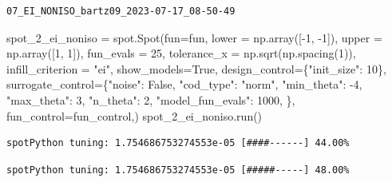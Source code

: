 \documentclass[
  letterpaper,
  DIV=11,
  numbers=noendperiod]{scrreprt}
\newenvironment{Shaded}{\begin{snugshade}}{\end{snugshade}}
\newcommand{\DecValTok}[1]{\textcolor[rgb]{0.68,0.00,0.00}{#1}}
\newcommand{\NormalTok}[1]{\textcolor[rgb]{0.00,0.23,0.31}{#1}}
\newcommand{\OperatorTok}[1]{\textcolor[rgb]{0.37,0.37,0.37}{#1}}
\newcommand{\StringTok}[1]{\textcolor[rgb]{0.13,0.47,0.30}{#1}}
\newcommand{\VariableTok}[1]{\textcolor[rgb]{0.07,0.07,0.07}{#1}}
\begin{document}
\begin{verbatim}
07_EI_NONISO_bartz09_2023-07-17_08-50-49
\end{verbatim}

\begin{Shaded}
\begin{Highlighting}[]
\NormalTok{spot\_2\_ei\_noniso }\OperatorTok{=}\NormalTok{ spot.Spot(fun}\OperatorTok{=}\NormalTok{fun,}
\NormalTok{                   lower }\OperatorTok{=}\NormalTok{ np.array([}\OperatorTok{{-}}\DecValTok{1}\NormalTok{, }\OperatorTok{{-}}\DecValTok{1}\NormalTok{]),}
\NormalTok{                   upper }\OperatorTok{=}\NormalTok{ np.array([}\DecValTok{1}\NormalTok{, }\DecValTok{1}\NormalTok{]),}
\NormalTok{                   fun\_evals }\OperatorTok{=} \DecValTok{25}\NormalTok{,}
\NormalTok{                   tolerance\_x }\OperatorTok{=}\NormalTok{ np.sqrt(np.spacing(}\DecValTok{1}\NormalTok{)),}
\NormalTok{                   infill\_criterion }\OperatorTok{=} \StringTok{"ei"}\NormalTok{,}
\NormalTok{                   show\_models}\OperatorTok{=}\VariableTok{True}\NormalTok{,}
\NormalTok{                   design\_control}\OperatorTok{=}\NormalTok{\{}\StringTok{"init\_size"}\NormalTok{: }\DecValTok{10}\NormalTok{\},}
\NormalTok{                   surrogate\_control}\OperatorTok{=}\NormalTok{\{}\StringTok{"noise"}\NormalTok{: }\VariableTok{False}\NormalTok{,}
                                      \StringTok{"cod\_type"}\NormalTok{: }\StringTok{"norm"}\NormalTok{,}
                                      \StringTok{"min\_theta"}\NormalTok{: }\OperatorTok{{-}}\DecValTok{4}\NormalTok{,}
                                      \StringTok{"max\_theta"}\NormalTok{: }\DecValTok{3}\NormalTok{,}
                                      \StringTok{"n\_theta"}\NormalTok{: }\DecValTok{2}\NormalTok{,}
                                      \StringTok{"model\_fun\_evals"}\NormalTok{: }\DecValTok{1000}\NormalTok{,}
\NormalTok{                                      \},}
\NormalTok{                    fun\_control}\OperatorTok{=}\NormalTok{fun\_control,)}
\NormalTok{spot\_2\_ei\_noniso.run()}
\end{Highlighting}
\end{Shaded}

\begin{verbatim}
spotPython tuning: 1.754686753274553e-05 [####------] 44.00% 
\end{verbatim}

\begin{verbatim}
spotPython tuning: 1.754686753274553e-05 [#####-----] 48.00% 
\end{verbatim}
\end{document}
